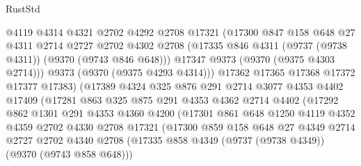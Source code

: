 \begin{lexlean}{RustStd}
\begin{coremodule}
                        @4119
                        @4314
                        @4321
                        @2702
                        @4292
                        @2708
                        @17321
                        (@17300
                          @847
                          @158
                          @648
                          @27
                          @4311
                          @2714
                          @2727
                          @2702
                          @4302
                          @2708
                          (@17335 @846 @4311 (@9737 (@9738 @4311)) (@9370 (@9743 @846 @648)))
                          @17347
                          @9373
                          (@9370 (@9375 @4303 @2714)))
                        @9373
                        (@9370 (@9375 @4293 @4314)))
                      @17362
                      @17365
                      @17368
                      @17372
                      @17377
                      @17383)
                    (@17389
                      @4324
                      @325
                      @876
                      @291
                      @2714
                      @3077
                      @4353
                      @4402
                      @17409
                      (@17281
                        @863
                        @325
                        @875
                        @291
                        @4353
                        @4362
                        @2714
                        @4402
                        (@17292
                          @862
                          @1301
                          @291
                          @4353
                          @4360
                          @4200
                          (@17301
                            @861
                            @648
                            @1250
                            @4119
                            @4352
                            @4359
                            @2702
                            @4330
                            @2708
                            @17321
                            (@17300
                              @859
                              @158
                              @648
                              @27
                              @4349
                              @2714
                              @2727
                              @2702
                              @4340
                              @2708
                              (@17335 @858 @4349 (@9737 (@9738 @4349)) (@9370 (@9743 @858 @648)))

\end{coremodule}
\end{lexlean}
